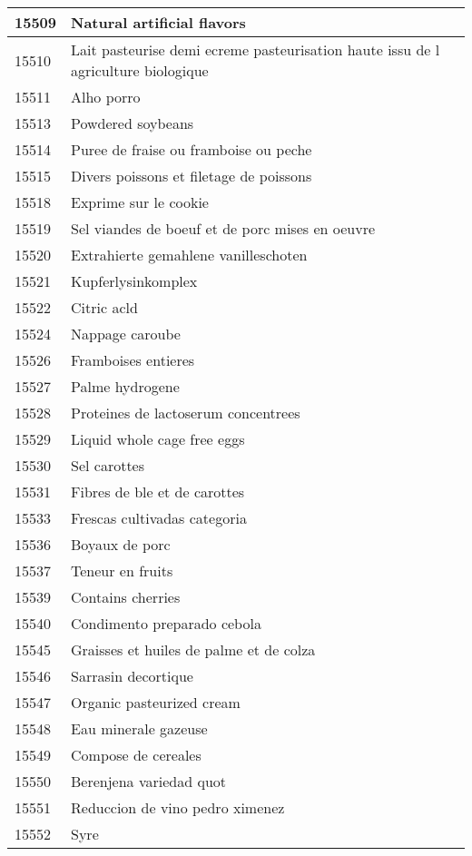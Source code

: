 \begin{longtable}{|l|l|}
15509 & Natural artificial flavors \\ \hline 
15510 & Lait pasteurise demi ecreme pasteurisation haute issu de l agriculture biologique \\ \hline 
15511 & Alho porro \\ \hline 
15513 & Powdered soybeans \\ \hline 
15514 & Puree de fraise ou framboise ou peche \\ \hline 
15515 & Divers poissons et filetage de poissons \\ \hline 
15518 & Exprime sur le cookie \\ \hline 
15519 & Sel viandes de boeuf et de porc mises en oeuvre \\ \hline 
15520 & Extrahierte gemahlene vanilleschoten \\ \hline 
15521 & Kupferlysinkomplex \\ \hline 
15522 & Citric acld \\ \hline 
15524 & Nappage caroube \\ \hline 
15526 & Framboises entieres \\ \hline 
15527 & Palme hydrogene \\ \hline 
15528 & Proteines de lactoserum concentrees \\ \hline 
15529 & Liquid whole cage free eggs \\ \hline 
15530 & Sel carottes \\ \hline 
15531 & Fibres de ble et de carottes \\ \hline 
15533 & Frescas cultivadas categoria \\ \hline 
15536 & Boyaux de porc \\ \hline 
15537 & Teneur en fruits \\ \hline 
15539 & Contains cherries \\ \hline 
15540 & Condimento preparado cebola \\ \hline 
15545 & Graisses et huiles de palme et de colza \\ \hline 
15546 & Sarrasin decortique \\ \hline 
15547 & Organic pasteurized cream \\ \hline 
15548 & Eau minerale gazeuse \\ \hline 
15549 & Compose de cereales \\ \hline 
15550 & Berenjena variedad quot \\ \hline 
15551 & Reduccion de vino pedro ximenez \\ \hline 
15552 & Syre \\ \hline 

\end{longtable}
